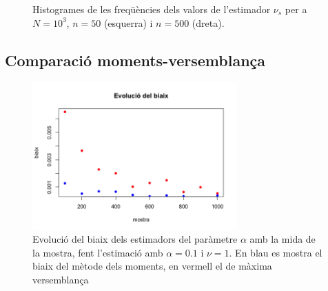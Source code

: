 \documentclass[12pt, catalan]{article}
\numberwithin{table}{section}
\numberwithin{figure}{section}
\numberwithin{equation}{section}
\begin{document}
\begin{figure}[!ht]
     \hfill
     \caption{Histogrames de les freqüències dels valors de l'estimador $\nu_s$ per a $N=10^3$, $n=50$ (esquerra) i $n=500$ (dreta).}
     \label{compararvers}
  \end{figure}

\subsection{Comparació moments-versemblança}
\begin{figure}[htb]
	\sffamily \small \centering
	\includegraphics[width = 0.7\textwidth]{biaix.png}
	\caption{Evolució del biaix dels estimadors del paràmetre \( \alpha \) amb la mida de la mostra, fent l'estimació amb \( \alpha = 0.1 \) i \( \nu = 1 \). En blau es mostra el biaix del mètode dels moments, en vermell el de màxima versemblança}
	\label{fig:biaix}
\end{figure}
\end{document}
